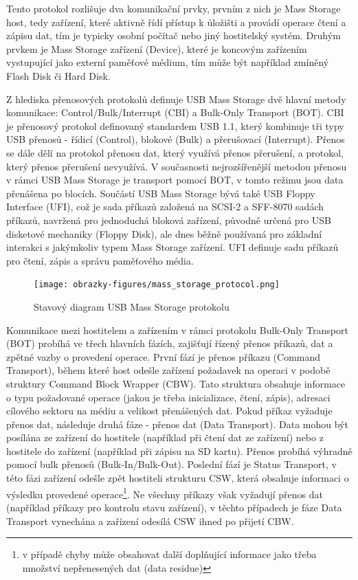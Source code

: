 Tento protokol rozlišuje dva komunikační prvky, prvním z nich je Mass Storage host, tedy zařízení, které aktivně řídí přístup k úložišti a provádí operace čtení a zápisu dat, tím je typicky osobní počítač nebo jiný hostitelský systém. Druhým prvkem je Mass Storage zařízení (Device), které je koncovým zařízením vystupující jako externí paměťové médium, tím může být například zmíněný Flash Disk či Hard Disk.

Z hlediska přenosových protokolů definuje USB Mass Storage dvě hlavní metody komunikace: Control/Bulk/Interrupt (CBI) a Bulk-Only Transport (BOT). CBI je přenosový protokol definovaný standardem USB 1.1, který kombinuje tři typy USB přenosů - řídicí (Control), blokové (Bulk) a přerušovací (Interrupt). Přenos se dále dělí na protokol přenosu dat, který využívá přenos přerušení, a protokol, který přenos přerušení nevyužívá. V současnosti nejrozšířenější metodou přenosu v rámci USB Mass Storage je transport pomocí BOT, v tomto režimu jsou data přenášena po blocích.
Součástí USB Mass Storage bývá také USB Floppy Interface (UFI), což je sada příkazů založená na SCSI-2 a SFF-8070 sadách příkazů, navržená pro jednoduchá bloková zařízení, původně určená pro USB disketové mechaniky (Floppy Disk), ale dnes běžně používaná pro základní interakci s jakýmkoliv typem Mass Storage zařízení. UFI definuje sadu příkazů pro čtení, zápis a správu paměťového média. \cite{usb_standard_ufi}

\begin{figure}[h]
    \centering
    \texttt{[image: obrazky-figures/mass\_storage\_protocol.png]}
    
    \caption{Stavový diagram USB Mass Storage protokolu \cite{silicon_labs_mass_storage_protocol}}
    \label{fig:mass-storage-protocol}
\end{figure}

Komunikace mezi hostitelem a zařízením v rámci protokolu Bulk-Only Transport (BOT) probíhá ve třech hlavních fázích, zajišťují řízený přenos příkazů, dat a zpětné vazby o provedení operace. První fází je přenos příkazu (Command Transport), během které host odešle zařízení požadavek na operaci v podobě struktury Command Block Wrapper (CBW). Tato struktura obsahuje informace o typu požadované operace (jakou je třeba inicializace, čtení, zápis), adresaci cílového sektoru na médiu a velikost přenášených dat. Pokud příkaz vyžaduje přenos dat, následuje druhá fáze - přenos dat (Data Transport). Data mohou být posílána ze zařízení do hostitele (například při čtení dat ze zařízení) nebo z hostitele do zařízení (například při zápisu na SD kartu). Přenos probíhá výhradně pomocí bulk přenosů (Bulk-In/Bulk-Out). Poslední fází je Status Transport, v této fázi zařízení odešle zpět hostiteli strukturu CSW, která obsahuje informaci o výsledku provedené operace\footnote{v případě chyby může obsahovat další doplňující informace jako třeba množství nepřenesených dat (data residue)}. Ne všechny příkazy však vyžadují přenos dat (například příkazy pro kontrolu stavu zařízení), v těchto případech je fáze Data Transport vynechána a zařízení odesílá CSW ihned po přijetí CBW. \cite{silicon_labs_mass_storage_protocol}

